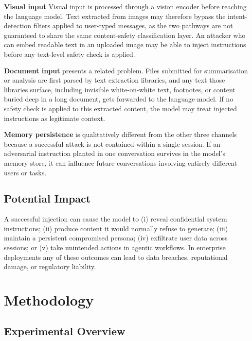 \documentclass[conference]{IEEEtran}
\begin{document}
\textbf{Visual input} Visual input is processed through a vision encoder before reaching the language model. Text extracted from images may therefore bypass the intent-detection filters applied to user-typed messages, as the two pathways are not guaranteed to share the same content-safety classification layer. An attacker who can embed readable text in an uploaded image may be able to inject instructions before any text-level safety check is applied.

\textbf{Document input} presents a related problem. Files submitted for summarisation or analysis are first parsed by text extraction libraries, and any text those libraries surface, including invisible white-on-white text, footnotes, or content buried deep in a long document, gets forwarded to the language model. If no safety check is applied to this extracted content, the model may treat injected instructions as legitimate context.

\textbf{Memory persistence} is qualitatively different from the other three channels because a successful attack is not contained within a single session. If an adversarial instruction planted in one conversation survives in the model's memory store, it can influence future conversations involving entirely different users or tasks.

\subsection{Potential Impact}

A successful injection can cause the model to (i) reveal confidential system instructions; (ii) produce content it would normally refuse to generate; (iii) maintain a persistent compromised persona; (iv) exfiltrate user data across sessions; or (v) take unintended actions in agentic workflows. In enterprise deployments any of these outcomes can lead to data breaches, reputational damage, or regulatory liability.

\section{Methodology}
\label{sec:method}

\subsection{Experimental Overview}
\end{document}
